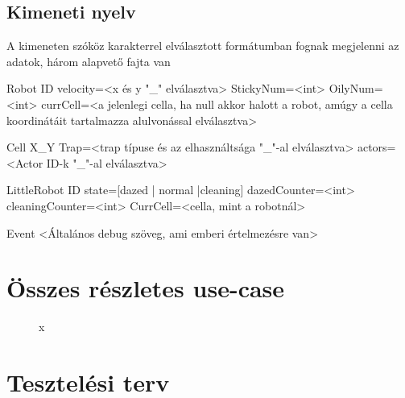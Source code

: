 \subsection{Kimeneti nyelv}
A kimeneten szóköz karakterrel elválasztott formátumban fognak megjelenni az adatok, három alapvető fajta van

Robot ID velocity=<x és y "\_" elválasztva> StickyNum=<int> OilyNum=<int> currCell=<a jelenlegi cella, ha null akkor halott a robot, amúgy a cella koordinátáit tartalmazza alulvonással elválasztva>

Cell X\_Y Trap=<trap típuse és az elhasználtsága "\_"-al elválasztva> actors=<Actor ID-k "\_"-al elválasztva>

LittleRobot ID state=[dazed | normal |cleaning] dazedCounter=<int> cleaningCounter=<int> CurrCell=<cella, mint a robotnál>

Event <Általános debug szöveg, ami emberi értelmezésre van>

\section{Összes részletes use-case}

\begin{figure}[h]
\begin{center}
\caption{x}
\label{fig:ProtoUseCase}
\end{center}
\end{figure}


\section{Tesztelési terv}






